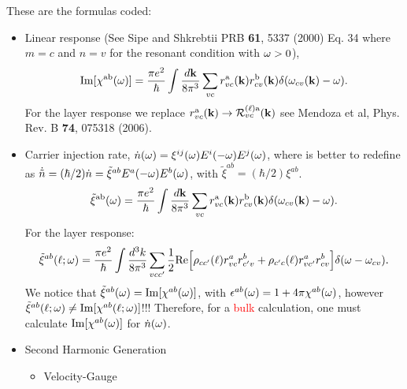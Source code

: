 \documentclass[openany,oneside]{book}
\numberwithin{equation}{section}
\begin{document}
These are the formulas coded:

\begin{itemize}

\item Linear response (See Sipe and Shkrebtii PRB {\bf 61}, 5337 (2000) Eq. 34
where $m=c$ and $n=v$ for the resonant condition with $\omega>0$),
\begin{equation*}\label{chif}
\mathrm{Im}[\chi^{\mathrm{a}\mathrm{b}}(\omega)]=\frac{\pi e^2}{\hbar}
\int \frac{d\mathbf{k}}{8\pi^3}
\sum_{vc}
r^{\mathrm{a}}_{vc}(\mathbf{k})r^{\mathrm{b}}_{cv}(\mathbf{k})\delta(\omega_{cv}(\mathbf{k})-\omega)
.
\end{equation*} 
For the layer response we replace $r^{\mathrm{a}}_{vc}(\mathbf{k})\to{\cal
 R}^{(\ell)\mathrm{a}}_{vc}(\mathbf{k})$ see Mendoza et al, Phys. Rev. B {\bf 74},
075318 (2006).

\item Carrier injection rate, 
$\dot n(\omega)=\xi^{ij}(\omega)E^i(-\omega)E^j(\omega)$,
where is better to redefine as $\dot{\tilde n}=(\hbar/2)\dot n=\tilde\xi^{ab}E^a(-\omega)E^b(\omega)$, with
$\tilde\xi^{ab}=(\hbar/2)\xi^{ab}$.
\begin{equation*}\label{chifp}
\tilde\xi^{\mathrm{a}\mathrm{b}}(\omega)=\frac{\pi e^2}{\hbar}
\int \frac{d\mathbf{k}}{8\pi^3}
\sum_{vc}
r^{\mathrm{a}}_{vc}(\mathbf{k})r^{\mathrm{b}}_{cv}(\mathbf{k})\delta(\omega_{cv}(\mathbf{k})-\omega)
.
\end{equation*} 
For the layer response:
\begin{equation*}\label{xizn}
\tilde\xi^{ab}(\ell;\omega)
=
\frac{\pi e^2}{\hbar}
\int\frac{d^3k}{8\pi^3}
\sum_{vcc'}
\frac{1}{2}\mathrm{Re}\Big[
\rho_{cc'}(\ell)    
r^a_{vc} 
r^b_{c'v}
+
\rho_{c'c}(\ell) 
r^a_{vc'} 
r^b_{cv}
\Big]
\delta(\omega-\omega_{cv})
.
\end{equation*}
We notice that $\tilde\xi^{ab}(\omega)=\mathrm{Im}[\chi^{ab}(\omega)]$, with
$\epsilon^{ab}(\omega)=1+4\pi\chi^{ab}(\omega)$, however 
$\tilde\xi^{ab}(\ell;\omega)\neq\mathrm{Im}[\chi^{ab}(\ell;\omega)]$!!!
Therefore, for a \textcolor{red}{bulk} calculation, one must calculate
$\mathrm{Im}[\chi^{ab}(\omega)]$ for $\dot n(\omega)$.

\item Second Harmonic Generation
\begin{itemize}
\item Velocity-Gauge 


\end{itemize}
\end{itemize}
\end{document}
